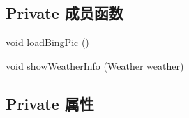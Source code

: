 \subsection*{Private 成员函数}
\begin{DoxyCompactItemize}
\item 
void \mbox{\hyperlink{classcom_1_1example_1_1akisame__lin_1_1love__air2_1_1weather_1_1_weather_activity_a24b141551623face67c8eb4fa6d16458}{load\+Bing\+Pic}} ()
\item 
void \mbox{\hyperlink{classcom_1_1example_1_1akisame__lin_1_1love__air2_1_1weather_1_1_weather_activity_a9a66acd1d6efb1ef31bfcb4e5034adf9}{show\+Weather\+Info}} (\mbox{\hyperlink{classcom_1_1example_1_1akisame__lin_1_1love__air2_1_1weather_1_1gson_1_1_weather}{Weather}} weather)
\end{DoxyCompactItemize}
\subsection*{Private 属性}
